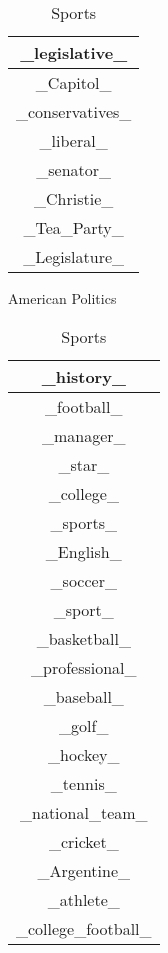 \documentclass{article}
\begin{document}
\begin{table}[ht]
{\begin{tabular}{|c|}
    \hline
    \_legislative\_\\
    \hline
    \_Capitol\_\\
    \hline
    \_conservatives\_\\
    \hline
    \_liberal\_\\
    \hline
    \_senator\_\\
    \hline
    \_Christie\_\\
    \hline
    \_Tea\_Party\_\\
    \hline
    \_Legislature\_\\
    \hline
    \end{tabular}
    \caption{American Politics}
    }
    \hfill
    \parbox{.2\linewidth}{
    \centering
    \begin{tabular}{|c|}
    \hline
    \_history\_\\
    \hline
    \_football\_\\
    \hline
    \_manager\_\\
    \hline
    \_star\_\\
    \hline
    \_college\_\\
    \hline
    \_sports\_\\
    \hline
    \_English\_\\
    \hline
    \_soccer\_\\
    \hline
    \_sport\_\\
    \hline
    \_basketball\_\\
    \hline
    \_professional\_\\
    \hline
    \_baseball\_\\
    \hline
    \_golf\_\\
    \hline
    \_hockey\_\\
    \hline
    \_tennis\_\\
    \hline
    \_national\_team\_\\
    \hline
    \_cricket\_\\
    \hline
    \_Argentine\_\\
    \hline
    \_athlete\_\\
    \hline
    \_college\_football\_\\
    \hline
    \end{tabular}
    \caption{Sports}
    }
\end{table}
    \\\\\\\\\\\\\\
\end{document}
